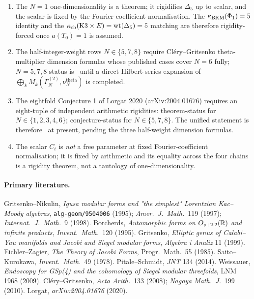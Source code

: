 \begin{enumerate}
\item The $N=1$ one-dimensionality is a theorem; it rigidifies
$\Delta_5$ up to scalar, and the scalar is fixed by the
Fourier-coefficient normalisation. The $\kappa_{\mathrm{BKM}}(\Phi_1)=5$ identity and
the $\kappa_{\mathrm{ch}}(\mathrm{K}3\times E)=\mathrm{wt}(\Delta_5)=5$ matching are
therefore rigidity-forced once $a(T_0)=1$ is assumed.
\item The half-integer-weight rows $N\in\{5,7,8\}$ require
Cl\'ery--Gritsenko theta-multiplier dimension formulas whose published
cases cover $N=6$ fully; $N=5,7,8$ status is
\ClaimStatusConjectured\ until a direct Hilbert-series expansion of
$\bigoplus_k M_k(\Gamma^{(2)}_N,\nu^{\mathrm{theta}}_N)$ is completed.
\item The eightfold Conjecture 1 of Lorgat 2020
(arXiv:2004.01676) requires an eight-tuple of independent arithmetic
rigidities: theorem-status for $N\in\{1,2,3,4,6\}$;
conjecture-status for $N\in\{5,7,8\}$. The unified statement is
therefore \ClaimStatusConjectured\ at present, pending the three
half-weight dimension formulas.
\item The scalar $C_i$ is \emph{not} a free parameter at fixed
Fourier-coefficient normalisation; it is fixed by arithmetic and its
equality across the four chains is a rigidity theorem, not a tautology
of one-dimensionality.
\end{enumerate}

\paragraph{Primary literature.}
Gritsenko--Nikulin, \emph{Igusa modular forms and "the simplest"
Lorentzian Kac--Moody algebras}, \texttt{alg-geom/9504006} (1995);
\emph{Amer.\ J.\ Math.}\ 119 (1997); \emph{Internat.\ J.\ Math.}\ 9
(1998). Borcherds, \emph{Automorphic forms on $O_{s+2,2}(\mathbb{R})$ and
infinite products}, \emph{Invent.\ Math.}\ 120 (1995). Gritsenko,
\emph{Elliptic genus of Calabi--Yau manifolds and Jacobi and Siegel
modular forms}, \emph{Algebra i Analiz} 11 (1999). Eichler--Zagier,
\emph{The Theory of Jacobi Forms}, Progr.\ Math.\ 55 (1985).
Saito--Kurokawa, \emph{Invent.\ Math.}\ 49 (1978). Pitale--Schmidt,
\emph{JNT} 134 (2014). Weissauer, \emph{Endoscopy for GSp(4) and the
cohomology of Siegel modular threefolds}, LNM 1968 (2009).
Cl\'ery--Gritsenko, \emph{Acta Arith.}\ 133 (2008); \emph{Nagoya Math.\
J.}\ 199 (2010). Lorgat, \emph{arXiv:2004.01676} (2020).
